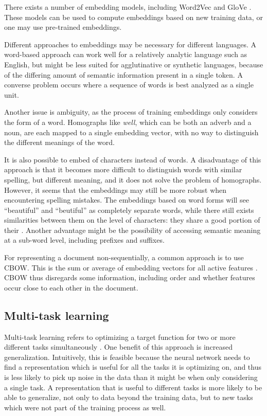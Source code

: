 There exists a number of embedding models, including Word2Vec
\autocite{mikolov2013word2vec} and GloVe \autocite{pennington2014glove}.
These models can be used to compute embeddings based on new training data, or
one may use pre-trained embeddings.

Different approaches to embeddings may be necessary for different languages.
A word-based approach can work well for a relatively analytic language such
as English, but might be less suited for agglutinative or synthetic
languages, because of the differing amount of semantic information present in
a single token. A converse problem occurs where a sequence of words is best
analyzed as a single unit.

Another issue is ambiguity, as the process of training embeddings only
considers the form of a word. Homographs like \emph{well}, which can be both
an adverb and a noun, are each mapped to a single embedding vector, with no
way to distinguish the different meanings of the word.

It is also possible to embed \ngrams of characters instead of words. A
disadvantage of this approach is that it becomes more difficult to
distinguish words with similar spelling, but different meaning, and it does
not solve the problem of homographs. However, it seems that the embeddings
may still be more robust when encountering spelling mistakes. The embeddings
based on word forms will see ``beautiful'' and ``beutiful'' as completely
separate words, while there still exists similarities between them on the
level of characters: they share a good portion of their \ngrams. Another
advantage might be the possibility of accessing semantic meaning at a
sub-word level, including prefixes and suffixes.

For representing a document non-sequentially, a common approach is to use
\ac{CBOW}. This is the sum or average of embedding vectors for all active
features \autocite[93]{goldbergNLP}. \ac{CBOW} thus disregards some
information, including order and whether features occur close to each other
in the document.


\subsection{Multi-task learning} \label{subsec:multitask}

Multi-task learning refers to optimizing a target function for two or more
different tasks simultaneously \autocite{ruder17overview}. One benefit of
this approach is increased generalization. Intuitively, this is feasible
because the neural network needs to find a representation which is useful for
all the tasks it is optimizing on, and thus is less likely to pick up noise
in the data than it might be when only considering a single task. A
representation that is useful to different tasks is more likely to be able to
generalize, not only to data beyond the training data, but to new tasks which
were not part of the training process as well.

